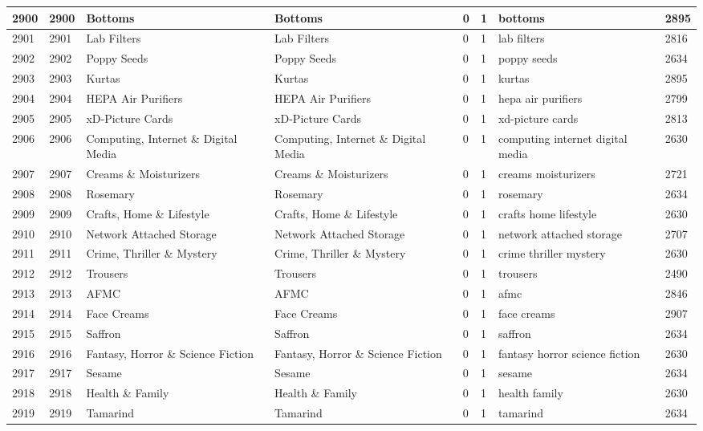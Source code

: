 \begin{longtable}{|l|l|l|l|l|l|l|l|}
2900 & 2900 & Bottoms & Bottoms & 0 & 1 & bottoms & 2895 \\ \hline 
2901 & 2901 & Lab Filters & Lab Filters & 0 & 1 & lab filters & 2816 \\ \hline 
2902 & 2902 & Poppy Seeds & Poppy Seeds & 0 & 1 & poppy seeds & 2634 \\ \hline 
2903 & 2903 & Kurtas & Kurtas & 0 & 1 & kurtas & 2895 \\ \hline 
2904 & 2904 & HEPA Air Purifiers & HEPA Air Purifiers & 0 & 1 & hepa air purifiers & 2799 \\ \hline 
2905 & 2905 & xD-Picture Cards & xD-Picture Cards & 0 & 1 & xd-picture cards & 2813 \\ \hline 
2906 & 2906 & Computing, Internet \& Digital Media & Computing, Internet \& Digital Media & 0 & 1 & computing internet digital media & 2630 \\ \hline 
2907 & 2907 & Creams \& Moisturizers & Creams \& Moisturizers & 0 & 1 & creams moisturizers & 2721 \\ \hline 
2908 & 2908 & Rosemary & Rosemary & 0 & 1 & rosemary & 2634 \\ \hline 
2909 & 2909 & Crafts, Home \& Lifestyle & Crafts, Home \& Lifestyle & 0 & 1 & crafts home lifestyle & 2630 \\ \hline 
2910 & 2910 & Network Attached Storage & Network Attached Storage & 0 & 1 & network attached storage & 2707 \\ \hline 
2911 & 2911 & Crime, Thriller \& Mystery & Crime, Thriller \& Mystery & 0 & 1 & crime thriller mystery & 2630 \\ \hline 
2912 & 2912 & Trousers & Trousers & 0 & 1 & trousers & 2490 \\ \hline 
2913 & 2913 & AFMC & AFMC & 0 & 1 & afmc & 2846 \\ \hline 
2914 & 2914 & Face Creams & Face Creams & 0 & 1 & face creams & 2907 \\ \hline 
2915 & 2915 & Saffron & Saffron & 0 & 1 & saffron & 2634 \\ \hline 
2916 & 2916 & Fantasy, Horror \& Science Fiction & Fantasy, Horror \& Science Fiction & 0 & 1 & fantasy horror science fiction & 2630 \\ \hline 
2917 & 2917 & Sesame & Sesame & 0 & 1 & sesame & 2634 \\ \hline 
2918 & 2918 & Health \& Family & Health \& Family & 0 & 1 & health family & 2630 \\ \hline 
2919 & 2919 & Tamarind & Tamarind & 0 & 1 & tamarind & 2634 \\ \hline 

\end{longtable}

